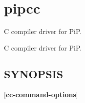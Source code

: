 \hypertarget{group__pipcc}{\section{pipcc}
\label{group__pipcc}
}


C compiler driver for Pi\-P.  


C compiler driver for Pi\-P. \hypertarget{group__piplnlibs_synopsis}{}\subsection{S\-Y\-N\-O\-P\-S\-I\-S}\label{group__piplnlibs_synopsis}
{ }\mbox{[}{\bfseries cc-\/command-\/options}\mbox{]} 